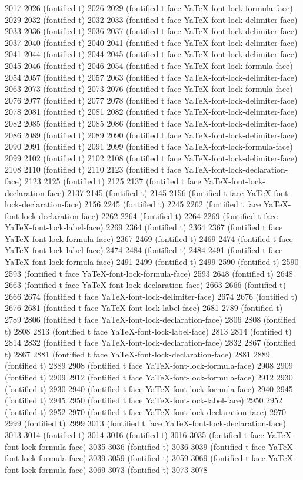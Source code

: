 2017 2026 (fontified t) 2026 2029 (fontified t face YaTeX-font-lock-formula-face) 2029 2032 (fontified t) 2032 2033 (fontified t face YaTeX-font-lock-delimiter-face) 2033 2036 (fontified t) 2036 2037 (fontified t face YaTeX-font-lock-delimiter-face) 2037 2040 (fontified t) 2040 2041 (fontified t face YaTeX-font-lock-delimiter-face) 2041 2044 (fontified t) 2044 2045 (fontified t face YaTeX-font-lock-delimiter-face) 2045 2046 (fontified t) 2046 2054 (fontified t face YaTeX-font-lock-formula-face) 2054 2057 (fontified t) 2057 2063 (fontified t face YaTeX-font-lock-delimiter-face) 2063 2073 (fontified t) 2073 2076 (fontified t face YaTeX-font-lock-formula-face) 2076 2077 (fontified t) 2077 2078 (fontified t face YaTeX-font-lock-delimiter-face) 2078 2081 (fontified t) 2081 2082 (fontified t face YaTeX-font-lock-delimiter-face) 2082 2085 (fontified t) 2085 2086 (fontified t face YaTeX-font-lock-delimiter-face) 2086 2089 (fontified t) 2089 2090 (fontified t face YaTeX-font-lock-delimiter-face) 2090 2091 (fontified t) 2091 2099 (fontified t face YaTeX-font-lock-formula-face) 2099 2102 (fontified t) 2102 2108 (fontified t face YaTeX-font-lock-delimiter-face) 2108 2110 (fontified t) 2110 2123 (fontified t face YaTeX-font-lock-declaration-face) 2123 2125 (fontified t) 2125 2137 (fontified t face YaTeX-font-lock-declaration-face) 2137 2145 (fontified t) 2145 2156 (fontified t face YaTeX-font-lock-declaration-face) 2156 2245 (fontified t) 2245 2262 (fontified t face YaTeX-font-lock-declaration-face) 2262 2264 (fontified t) 2264 2269 (fontified t face YaTeX-font-lock-label-face) 2269 2364 (fontified t) 2364 2367 (fontified t face YaTeX-font-lock-formula-face) 2367 2469 (fontified t) 2469 2474 (fontified t face YaTeX-font-lock-label-face) 2474 2484 (fontified t) 2484 2491 (fontified t face YaTeX-font-lock-formula-face) 2491 2499 (fontified t) 2499 2590 (fontified t) 2590 2593 (fontified t face YaTeX-font-lock-formula-face) 2593 2648 (fontified t) 2648 2663 (fontified t face YaTeX-font-lock-declaration-face) 2663 2666 (fontified t) 2666 2674 (fontified t face YaTeX-font-lock-delimiter-face) 2674 2676 (fontified t) 2676 2681 (fontified t face YaTeX-font-lock-label-face) 2681 2789 (fontified t) 2789 2806 (fontified t face YaTeX-font-lock-declaration-face) 2806 2808 (fontified t) 2808 2813 (fontified t face YaTeX-font-lock-label-face) 2813 2814 (fontified t) 2814 2832 (fontified t face YaTeX-font-lock-declaration-face) 2832 2867 (fontified t) 2867 2881 (fontified t face YaTeX-font-lock-declaration-face) 2881 2889 (fontified t) 2889 2908 (fontified t face YaTeX-font-lock-formula-face) 2908 2909 (fontified t) 2909 2912 (fontified t face YaTeX-font-lock-formula-face) 2912 2930 (fontified t) 2930 2940 (fontified t face YaTeX-font-lock-formula-face) 2940 2945 (fontified t) 2945 2950 (fontified t face YaTeX-font-lock-label-face) 2950 2952 (fontified t) 2952 2970 (fontified t face YaTeX-font-lock-declaration-face) 2970 2999 (fontified t) 2999 3013 (fontified t face YaTeX-font-lock-declaration-face) 3013 3014 (fontified t) 3014 3016 (fontified t) 3016 3035 (fontified t face YaTeX-font-lock-formula-face) 3035 3036 (fontified t) 3036 3039 (fontified t face YaTeX-font-lock-formula-face) 3039 3059 (fontified t) 3059 3069 (fontified t face YaTeX-font-lock-formula-face) 3069 3073 (fontified t) 3073 3078 